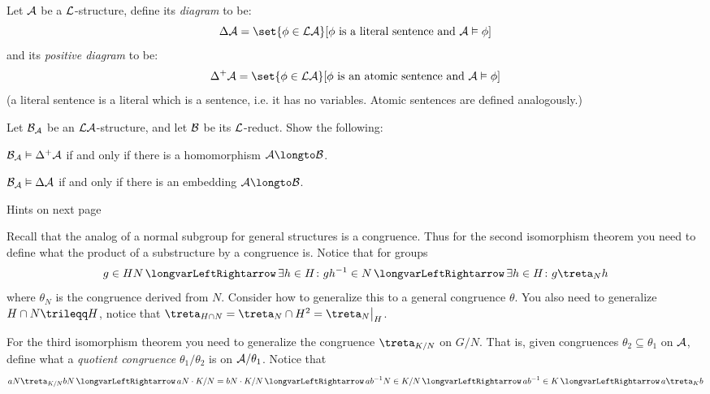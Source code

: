     Let ${\cal A}$ be a ${\cal L}$-structure, define its {\it diagram} to be:
    $$ \Delta\c A = \set{\phi\in\c L\c A}[\hbox{$\phi$ is a literal sentence and $\c A\vDash\phi$}] $$
    and its {\it positive diagram} to be:
    $$ \Delta^+\c A = \set{\phi\in\c L\c A}[\hbox{$\phi$ is an atomic sentence and $\c A\vDash\phi$}] $$
    (a literal sentence is a literal which is a sentence, i.e. it has no variables.
    Atomic sentences are defined analogously.)

    Let ${\cal B}_{{\cal A}}$ be an ${\cal L}{\cal A}$-structure, and let ${\cal B}$ be its ${\cal L}$-reduct.
    Show the following:
    \benum
        \item ${\cal B}_{{\cal A}}\vDash\Delta^+{\cal A}$ if and only if there is a homomorphism $\c A\longto\c B$.
        \item ${\cal B}_{{\cal A}}\vDash\Delta{\cal A}$ if and only if there is an embedding $\c A\longto\c B$.
    \eenum

\eprob

\vfill
\centerline{Hints on next page}
\break

\setcounter{math counter}{1}

\bhint

    Recall that the analog of a normal subgroup for general structures is a congruence.
    Thus for the second isomorphism theorem you need to define what the product of a substructure by a congruence is.
    Notice that for groups
    $$ g\in HN \iff \exists h\in H\colon gh^{-1}\in N \iff \exists h\in H\colon g\treta_Nh $$
    where $\theta_N$ is the congruence derived from $N$.
    Consider how to generalize this to a general congruence $\theta$.
    You also need to generalize $H\cap N\trileqq H$, notice that $\treta_{H\cap N}=\treta_N\cap H^2=\treta_N\bigl|_H$.

    For the third isomorphism theorem you need to generalize the congruence $\treta_{K/N}$ on $G/N$.
    That is, given congruences $\theta_2\subseteq\theta_1$ on ${\cal A}$, define what a {\it quotient congruence} $\theta_1/\theta_2$ is on ${\cal A}/\theta_1$.
    Notice that
    $$ aN\treta_{K/N}bN \iff aN\cdot K/N = bN\cdot K/N \iff ab^{-1}N\in K/N \iff ab^{-1}\in K \iff a\treta_Kb $$

\ehint

\setcounter{math counter}{4}

\bhint


